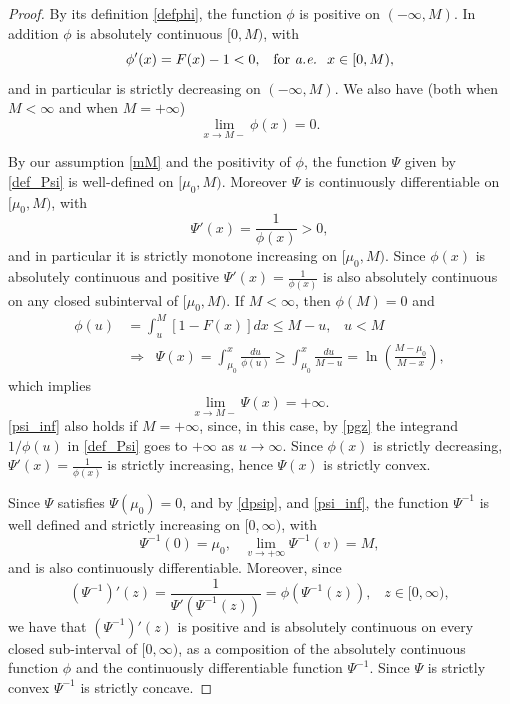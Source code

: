 \documentclass[10pt,a4paper]{amsart}
\begin{document}
	\begin{proof}
		By its definition \eqref{defphi}, the function $\phi$ is positive on $(-\infty,M)$. In addition
		$\phi$ is absolutely continuous  $[0,M)$, with
		$$\phi'(x)=F(x)-1<0,\;\;\;{\mbox{for {\it{a.e.}} }}\;x\in [0,M),$$
		and in particular is strictly decreasing on 
		$(-\infty,M)$.
		We also have (both when $M<\infty$ and when $M=+\infty$)
		\begin{equation}\label{pgz}
			\lim_{x\rightarrow M-}\phi(x)=0.
		\end{equation}
		
		By our assumption \eqref{mM} and the positivity of $\phi$, the function
		$\Psi$ given by \eqref{def_Psi} is well-defined on $[\mu_0,M)$.
		Moreover $\Psi$ is continuously differentiable on $[\mu_0,M)$, with
		\begin{equation}\label{dpsip}\Psi'(x)=\frac{1}{\phi(x)}>0,\end{equation}
		and in particular it is strictly monotone
		increasing on $[\mu_0,M)$. Since $\phi(x)$ is absolutely continuous and positive 
		$\Psi'(x)=\frac{1}{\phi(x)}$ is also absolutely continuous on any closed subinterval of $[\mu_0,M)$.
		If $M<\infty$, then $\phi(M)=0$ and
		\begin{align*}\phi(u)&=\int_{u}^M  [1-F(x)]dx\leq M-u,\;\;\; u<M\\
			&\Rightarrow\;\;\Psi(x)=\int_{\mu_0}^x \frac{du}{\phi(u)}\geq \int_{\mu_0}^x
			\frac{du}{M-u}=\ln\left( \frac{M-\mu_0}{M-x}\right),
		\end{align*}
		which implies 
		\begin{equation}\label{psi_inf}\lim_{x\rightarrow M-}\Psi(x)=+\infty.\end{equation}
		\eqref{psi_inf} also holds if $M=+\infty$,  
		since, in this case, by \eqref{pgz} the integrand $1/\phi(u)$ in \eqref{def_Psi} 
		goes to $+\infty$ as $u\rightarrow\infty$.
		Since $\phi(x)$ is strictly decreasing, 
		$\Psi'(x)=\frac{1}{\phi(x)}$ is strictly increasing, hence $\Psi(x)$ is strictly convex.
		
		Since $\Psi$  satisfies $\Psi(\mu_0)=0$, and by \eqref{dpsip}, and \eqref{psi_inf},
		the function 
		$\Psi^{-1}$ is well defined and strictly increasing on $[0,\infty)$, with
		\begin{equation}\label{psip}\Psi^{-1}(0)=\mu_0,\;\;\; \lim_{v\rightarrow +\infty} \Psi^{-1}(v)=M,\end{equation}
		and is also continuously differentiable.
		Moreover, since 
		$$(\Psi^{-1})'(z)=\frac{1}{\Psi'(\Psi^{-1}(z))}=\phi(\Psi^{-1}(z)),\;\;\;z\in [0,\infty),$$
		we have that $(\Psi^{-1})'(z)$ is positive and is absolutely continuous on every closed sub-interval of $[0,\infty)$, as a composition of the absolutely continuous function $\phi$ and the continuously  differentiable function $\Psi^{-1}$.
		Since $\Psi$ is strictly convex 
		$\Psi^{-1}$ is strictly concave.
		

\end{proof}
\end{document}
